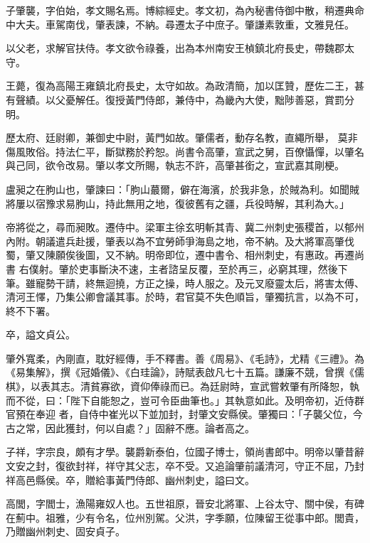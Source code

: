 \begin{pinyinscope}
 子肇襲，字伯始，孝文賜名焉。博綜經史。孝文初，為內秘書侍御中散，稍遷典命中大夫。車駕南伐，肇表諫，不納。尋遷太子中庶子。肇謙素敦重，文雅見任。



 以父老，求解官扶侍。孝文欲令祿養，出為本州南安王楨鎮北府長史，帶魏郡太守。



 王薨，復為高陽王雍鎮北府長史，太守如故。為政清簡，加以匡贊，歷佐二王，甚有聲績。以父憂解任。復授黃門侍郎，兼侍中，為畿內大使，黜陟善惡，賞罰分明。



 歷太府、廷尉卿，兼御史中尉，黃門如故。肇儒者，動存名教，直繩所舉，
 莫非傷風敗俗。持法仁平，斷獄務於矜恕。尚書令高肇，宣武之舅，百僚懾憚，以肇名與己同，欲令改易。肇以孝文所賜，執志不許，高肇甚銜之，宣武嘉其剛梗。



 盧昶之在朐山也，肇諫曰：「朐山蕞爾，僻在海濱，於我非急，於賊為利。如聞賊將屢以宿豫求易朐山，持此無用之地，復彼舊有之疆，兵役時解，其利為大。」



 帝將從之，尋而昶敗。遷侍中。梁軍主徐玄明斬其青、冀二州刺史張稷首，以郁州內附。朝議遣兵赴援，肇表以為不宜勞師爭海島之地，帝不納。及大將軍高肇伐蜀，肇又陳願俟後圖，又不納。明帝即位，遷中書令、相州刺史，有惠政。再遷尚書
 右僕射。肇於吏事斷決不速，主者諮呈反覆，至於再三，必窮其理，然後下筆。雖寵勢干請，終無迴撓，方正之操，時人服之。及元叉廢靈太后，將害太傅、清河王懌，乃集公卿會議其事。於時，君官莫不失色順旨，肇獨抗言，以為不可，終不下署。



 卒，謚文貞公。



 肇外寬柔，內剛直，耽好經傳，手不釋書。善《周易》、《毛詩》，尤精《三禮》。為《易集解》，撰《冠婚儀》、《白珪論》，詩賦表啟凡七十五篇。謙廉不競，曾撰《儒棋》，以表其志。清貧寡欲，資仰俸祿而已。為廷尉時，宣武嘗敕肇有所降恕，執而不從，曰：「陛下自能恕之，豈可令臣曲筆也。」其執意如此。及明帝初，近侍群官預在奉迎
 者，自侍中崔光以下並加封，封肇文安縣侯。肇獨曰：「子襲父位，今古之常，因此獲封，何以自處？」固辭不應。論者高之。



 子祥，字宗良，頗有才學。襲爵新泰伯，位國子博士，領尚書郎中。明帝以肇昔辭文安之封，復欲封祥，祥守其父志，卒不受。又追論肇前議清河，守正不屈，乃封祥高邑縣侯。卒，贈給事黃門侍郎、幽州刺史，謚曰文。



 高閭，字閻士，漁陽雍奴人也。五世祖原，晉安北將軍、上谷太守、關中侯，有碑在薊中。祖雅，少有令名，位州別駕。父洪，字季願，位陳留王從事中郎。閭貴，乃贈幽州刺史、固安貞子。




\end{pinyinscope}
